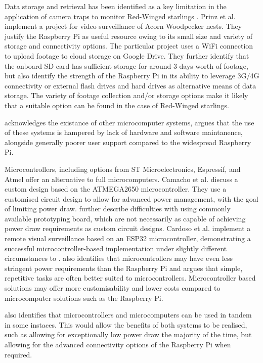 \documentclass[class=report,11pt,crop=false]{standalone}
\begin{document}
Data storage and retrieval has been identified as a key limitation in the application of camera traps to monitor Red-Winged starlings \cite{hofmeyer2024private}. Prinz et al. \cite{prinz2016a} implement a project for video surveillance of Acorn Woodpecker nests. They justify the Raspberry Pi as useful resource owing to its small size and variety of storage and connectivity options. The particular project uses a WiFi connection to upload footage to cloud storage on Google Drive. They further identify that the onboard SD card has sufficient storage for around 3 days worth of footage, but also identify the strength of the Raspberry Pi in its ability to leverage 3G/4G connectivity or external flash drives and hard drives as alternative means of data storage.  The variety of footage collection and/or storage options make it likely that a suitable option can be found in the case of Red-Winged starlings.

\cite{jolles2021broad-scale} acknowledges the existance of other microcomputer systems, argues that the use of these systems is hampered by lack of hardware and software maintanence, alongside generally poorer user support compared to the widespread Raspberry Pi. 

Microcontrollers, including options from ST Microelectronics, Espressif, and Atmel offer an alternative to full microcomputers. Camacho et al. \cite{camacho2017deployment} discuss a custom design based on the ATMEGA2650 microcontroller. They use a customised circuit design to allow for advanced power management, with the goal of limiting power draw. \cite{camacho2017deployment} further describe difficulties with using commonly available prototyping board, which are not necessarily as capable of achieving power draw requirements as custom circuit designs. Cardoso et al. \cite{cardoso2022internet} implement a remote visual surveillance based on an ESP32 microcontroller, demonstrating a successful microcontroller-based implementation under slightly different circumstances to \cite{camacho2017deployment}. \cite{jolles2021broad-scale} also identifies that microcontrollers may have even less stringent power requirements than the Raspberry Pi and argues that simple, repetitive tasks are often better suited to microcontrollers. Microcontroller based solutions may offer more customisability and lower costs compared to microcomputer solutions such as the Raspberry Pi.

 \cite{jolles2021broad-scale} also identifies that microcontrollers and microcomputers can be used in tandem in some instaces. This would allow the benefits of both systems to be realised, such as allowing for exceptionally low power draw the majority of the time, but allowing for the advanced connectivity options of the Raspberry Pi when required.
\end{document}
